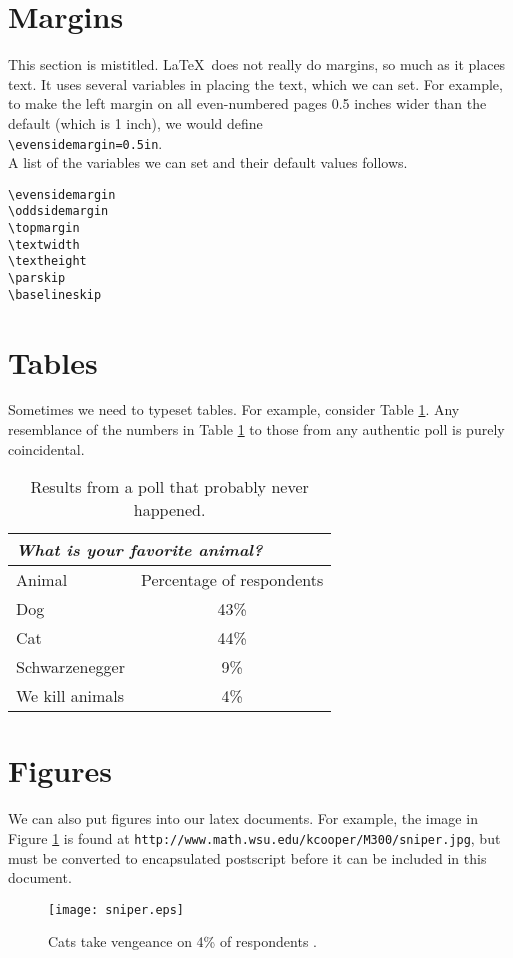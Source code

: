 \documentclass[12pt]{article}
\begin{document}
\section{Margins}
This section is mistitled.  \LaTeX\ does not really do margins,
so much as it places text.  It uses several variables in placing the
text, which we can set.  For example, to make the left margin on
all even-numbered pages 0.5 inches wider than the default (which is 
1 inch), we would define\\
\verb(\evensidemargin=0.5in(.\\
A list of the variables we can set and their default values follows.
\begin{verbatim}
\evensidemargin
\oddsidemargin
\topmargin
\textwidth
\textheight
\parskip
\baselineskip
\end{verbatim}

\section{Tables}
Sometimes we need to typeset tables.  For example, 
consider Table \ref{animaltable}.  
Any resemblance of the numbers in 
Table \ref{animaltable} to those from any authentic poll is purely coincidental.
\begin{table}
\begin{center}
\caption{\label{animaltable}
Results from a poll that probably never happened.}
\begin{tabular}{||l|c||}
\hline
\cline{1-2}
\multicolumn{2}{||l||}{{\it What is your favorite animal?}}\\
\hline
Animal & Percentage of respondents\\
\hline
Dog & 43\%\\
Cat & 44\%\\
Schwarzenegger & 9\%\\
We kill animals & 4\%\\
\hline
\hline
\end{tabular}
\end{center}
\end{table}

\section{Figures}
We can also put figures into our latex documents.  For example, the
image in Figure \ref{sniper} is found at 
{\tt http://www.math.wsu.edu/kcooper/M300/sniper.jpg}, but must
be converted to encapsulated postscript before it can be included
in this document.
\begin{figure}[ht]
\begin{center}
\texttt{[image: sniper.eps]}
\caption{\label{sniper}
Cats take vengeance on 4\% of respondents \cite{calvin}.}
\vfill
\end{center}
\end{figure}
\end{document}
